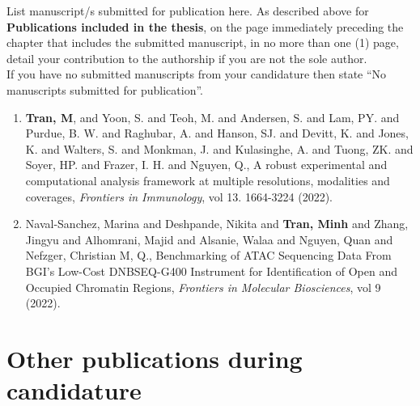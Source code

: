 \begin{instructional}
	List manuscript/s submitted for publication here. As described above for \textbf{Publications included in the thesis}, on the page immediately preceding the chapter that includes the submitted manuscript, in no more than one (1) page, detail your contribution to the authorship if you are not the sole author.\\
    
    \noindent
    If you have no submitted manuscripts from your candidature then state ``No manuscripts submitted for publication''.\\
    
    \begin{enumerate}

    \item \cite{tran2022robust} \textbf{Tran, M}, and Yoon, S. and Teoh, M. and Andersen, S. and Lam, PY. and Purdue, B. W. and Raghubar, A. and Hanson, SJ. and Devitt, K. and Jones, K. and Walters, S. and Monkman, J. and Kulasinghe, A. and Tuong, ZK. and Soyer, HP. and Frazer, I. H. and Nguyen, Q., A robust experimental and computational analysis framework at multiple resolutions, modalities and coverages, \textit{Frontiers in Immunology}, vol 13. 1664-3224 (2022).
    
    \item \cite{naval2022benchmarking} Naval-Sanchez, Marina and Deshpande, Nikita and \textbf{Tran, Minh} and Zhang, Jingyu and Alhomrani, Majid and Alsanie, Walaa and Nguyen, Quan and Nefzger, Christian M, Q., Benchmarking of ATAC Sequencing Data From BGI’s Low-Cost DNBSEQ-G400 Instrument for Identification of Open and Occupied Chromatin Regions, \textit{Frontiers in Molecular Biosciences}, vol 9 (2022).
    \end{enumerate}
\end{instructional}





\section*{Other publications during candidature}

